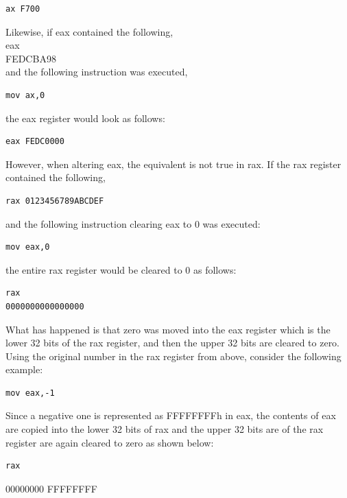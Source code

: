 \documentclass[10pt]{book}
\begin{document}
\begin{verbatim}
ax F700
\end{verbatim}

Likewise, if eax contained the following,\\
eax\\
FEDCBA98\\
and the following instruction was executed,

\begin{verbatim}
mov ax,0
\end{verbatim}

the eax register would look as follows:

\begin{verbatim}
eax FEDC0000
\end{verbatim}

However, when altering eax, the equivalent is not true in rax. If the rax register contained the following,

\begin{verbatim}
rax 0123456789ABCDEF
\end{verbatim}

and the following instruction clearing eax to 0 was executed:

\begin{verbatim}
mov eax,0
\end{verbatim}

the entire rax register would be cleared to 0 as follows:

\begin{verbatim}
rax
0000000000000000
\end{verbatim}

What has happened is that zero was moved into the eax register which is the lower 32 bits of the rax register, and then the upper 32 bits are cleared to zero. Using the original number in the rax register from above, consider the following example:

\begin{verbatim}
mov eax,-1
\end{verbatim}

Since a negative one is represented as FFFFFFFFh in eax, the contents of eax are copied into the lower 32 bits of rax and the upper 32 bits are of the rax register are again cleared to zero as shown below:

\begin{verbatim}
rax
\end{verbatim}

00000000 FFFFFFFF
\end{document}
